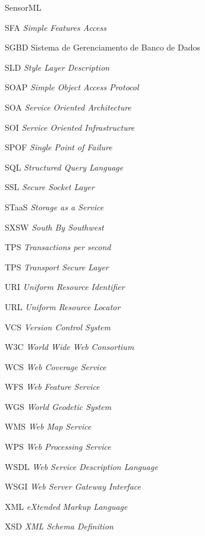 \documentclass[diss]{template/setrem}
\begin{document}
\begin{listofabbrv}{SensorML}
\item[SFA] \emph{Simple Features Access}
\item[SGBD] Sistema de Gerenciamento de Banco de Dados
\item[SLD] \emph{Style Layer Description}
\item[SOAP] \emph{Simple Object Access Protocol}
\item[SOA] \emph{Service Oriented Architecture}
\item[SOI] \emph{Service Oriented Infrastructure}
\item[SPOF] \emph{Single Point of Failure}
\item[SQL] \emph{Structured Query Language}
\item[SSL] \emph{Secure Socket Layer}
\item[STaaS] \emph{Storage as a Service}
\item[SXSW] \emph{South By Southwest}
\item[TPS] \emph{Transactions per second}
\item[TPS] \emph{Transport Secure Layer}
\item[URI] \emph{Uniform Resource Identifier}
\item[URL] \emph{Uniform Resource Locator}
\item[VCS] \emph{Version Control System}
\item[W3C] \emph{World Wide Web Consortium}
\item[WCS] \emph{Web Coverage Service}
\item[WFS] \emph{Web Feature Service}
\item[WGS] \emph{World Geodetic System}
\item[WMS] \emph{Web Map Service}
\item[WPS] \emph{Web Processing Service}
\item[WSDL] \emph{Web Service Description Language}
\item[WSGI] \emph{Web Server Gateway Interface}
\item[XML] \emph{eXtended Markup Language}
\item[XSD] \emph{XML Schema Definition}
\end{listofabbrv}


\tableofcontents
\end{document}
